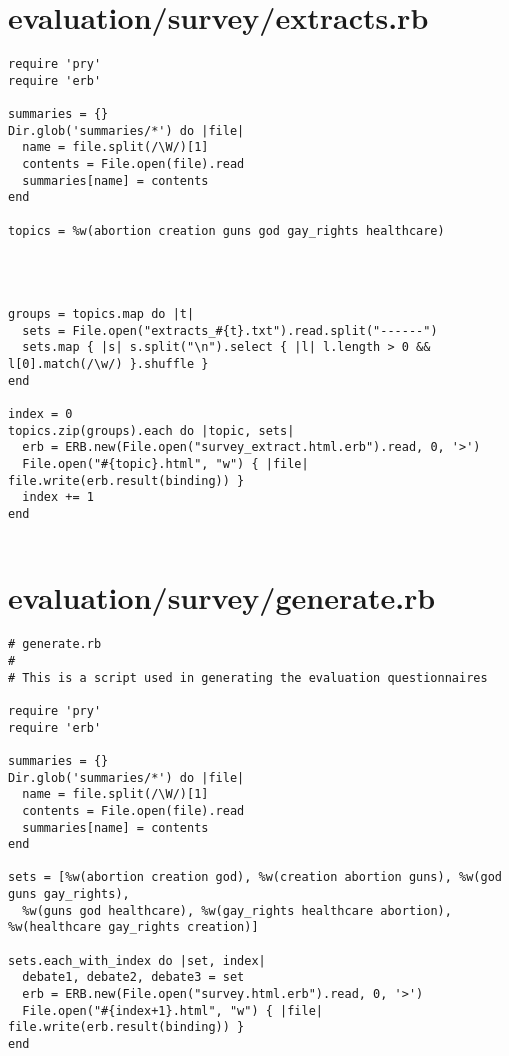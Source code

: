 \documentclass{article}
\begin{document}
\section*{evaluation/survey/extracts.rb}
\begin{verbatim}
require 'pry'
require 'erb'

summaries = {}
Dir.glob('summaries/*') do |file|
  name = file.split(/\W/)[1]
  contents = File.open(file).read
  summaries[name] = contents
end

topics = %w(abortion creation guns god gay_rights healthcare)




groups = topics.map do |t|
  sets = File.open("extracts_#{t}.txt").read.split("------")
  sets.map { |s| s.split("\n").select { |l| l.length > 0 && l[0].match(/\w/) }.shuffle }
end

index = 0
topics.zip(groups).each do |topic, sets|
  erb = ERB.new(File.open("survey_extract.html.erb").read, 0, '>')
  File.open("#{topic}.html", "w") { |file| file.write(erb.result(binding)) }
  index += 1
end


\end{verbatim}
\pagebreak

\section*{evaluation/survey/generate.rb}
\begin{verbatim}
# generate.rb
#
# This is a script used in generating the evaluation questionnaires

require 'pry'
require 'erb'

summaries = {}
Dir.glob('summaries/*') do |file|
  name = file.split(/\W/)[1]
  contents = File.open(file).read
  summaries[name] = contents
end

sets = [%w(abortion creation god), %w(creation abortion guns), %w(god guns gay_rights),
  %w(guns god healthcare), %w(gay_rights healthcare abortion), %w(healthcare gay_rights creation)]

sets.each_with_index do |set, index|
  debate1, debate2, debate3 = set
  erb = ERB.new(File.open("survey.html.erb").read, 0, '>')
  File.open("#{index+1}.html", "w") { |file| file.write(erb.result(binding)) }
end


\end{verbatim}
\pagebreak
\end{document}
